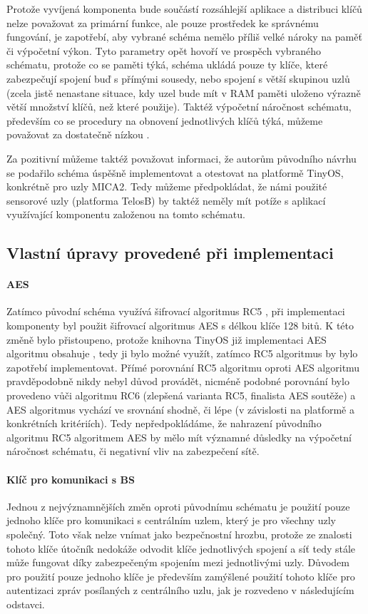 \documentclass[11pt,final,twoside]{fithesis2}
\begin{document}
Protože vyvíjená komponenta bude součástí rozsáhlejší aplikace a distribuci klíčů nelze považovat za primární funkce, ale pouze prostředek ke správnému fungování, je zapotřebí, aby vybrané schéma 
nemělo příliš velké nároky na paměť či výpočetní výkon. Tyto parametry opět hovoří ve prospěch vybraného schématu, protože co se paměti týká, schéma ukládá pouze ty klíče, které zabezpečují spojení 
buď s přímými sousedy,  nebo spojení s větší skupinou uzlů (zcela jistě nenastane situace, kdy uzel bude mít v RAM paměti uloženo výrazně větší množství klíčů, než které použije). Taktéž výpočetní náročnost 
schématu, především co se procedury na obnovení jednotlivých klíčů týká, můžeme považovat za dostatečně nízkou \cite{Zhu2006}. 

Za pozitivní můžeme taktéž považovat informaci, že autorům původního návrhu se podařilo schéma úspěšně implementovat a otestovat na platformě TinyOS, konkrétně pro uzly MICA2. Tedy můžeme předpokládat, že 
námi použité sensorové uzly (platforma TelosB) by taktéž neměly mít potíže s aplikací využívající komponentu založenou na tomto schématu.


\subsection{Vlastní úpravy provedené při implementaci} \label{sub:edits}

\paragraph{AES}
Zatímco původní schéma využívá šifrovací algoritmus RC5 \cite{Zhu2006}\cite{Rivest1995}, při implementaci komponenty byl použit šifrovací algoritmus AES \cite{Daemen1999} s délkou
klíče 128 bitů. K této změně bylo přistoupeno, protože knihovna TinyOS již implementaci AES algoritmu obsahuje \cite{Pelissier}, tedy ji bylo možné využít, zatímco RC5 algoritmus by bylo
zapotřebí implementovat. Přímé porovnání RC5 algoritmu oproti AES algoritmu pravděpodobně nikdy nebyl důvod provádět, nicméně podobné porovnání bylo provedeno vůči algoritmu RC6 \cite{Rivest1998} (zlepšená 
varianta RC5, finalista AES soutěže) a AES algoritmus vychází ve srovnání shodně, či lépe \cite{Schneier1999} (v závislosti na platformě a konkrétních kritériích). Tedy nepředpokládáme, že nahrazení 
původního algoritmu RC5 algoritmem AES by mělo mít významné důsledky na výpočetní náročnost schématu, či negativní vliv na zabezpečení sítě.

\paragraph{Klíč pro komunikaci s BS}
Jednou z nejvýznamnějších změn oproti původnímu schématu je použití pouze jednoho klíče pro komunikaci s centrálním uzlem, který je pro všechny uzly společný. Toto však nelze vnímat jako bezpečnostní hrozbu, 
protože ze znalosti tohoto klíče útočník nedokáže odvodit klíče jednotlivých spojení a síť tedy stále může fungovat díky zabezpečeným spojením mezi jednotlivými uzly. Důvodem pro použití pouze jednoho klíče 
je především zamýšlené použití tohoto klíče pro autentizaci zpráv posílaných z centrálního uzlu, jak je rozvedeno v následujícím odstavci.
\end{document}
